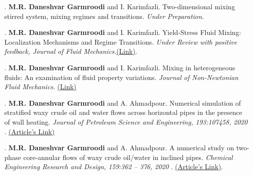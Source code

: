 \documentclass[11pt]{article}
\begin{document}
		. {\textbf{M.R. Daneshvar Garmroodi} and I. Karimfazli. Two-dimensional mixing stirred system, mixing regimes and transitions.\textit{ Under Preparation}}.
		
		. \textbf{M.R. Daneshvar Garmroodi} and I. Karimfazli. Yield-Stress Fluid Mixing: Localization Mechanisms and Regime Transitions.\textit{ Under Review with positive feedback, Journal of Fluid Mechanics.}\href{https://arxiv.org/pdf/2503.09359}{({Link})}.
		
		. {\textbf{M.R. Daneshvar Garmroodi} and I. Karimfazli. Mixing in heterogeneous fluids: An examination of fluid property variations.\textit{ Journal of Non-Newtonian Fluid Mechanics.}
			\href{https://doi.org/10.1016/j.jnnfm.2024.105196}{({Link})}}
		
		
		
		
		
		. {\textbf{M.R. Daneshvar Garmroodi} and A. Ahmadpour. Numerical simulation of stratified waxy crude oil and water flows across horizontal pipes in the presence of wall heating.\textit{ Journal of Petroleum Science and Engineering, 193:107458, 2020} . \href{https://www.sciencedirect.com/science/article/pii/S0920410520305295?casa_token=OMdAt0Hgt7oAAAAA:CxTTdlrFtpNTO3ZNe9jSEKOEc4iqD2lS5xVr-1FB0PAFSTMdcy_EblsQULZ0ZE2Oa_S_li90D4U}{({Article's Link})}}
		
		. {\textbf{M.R. Daneshvar Garmroodi} and A. Ahmadpour. A numerical study on two-phase core-annular flows of waxy crude oil/water in inclined pipes.\textit{ Chemical Engineering Research and Design, 159:362
				– 376, 2020} . \href{https://www.sciencedirect.com/science/article/abs/pii/S0263876220301696}{({Article's Link})}}.
		
\end{document}
